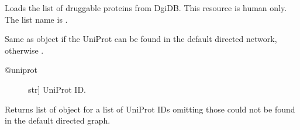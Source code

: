\documentclass[letterpaper,10pt,english]{sphinxmanual}
\begin{document}
\begin{fulllineitems}

\begin{fulllineitems}
\label{\detokenize{main:pypath.main.PyPath.dproteins}}
\end{fulllineitems}


\begin{fulllineitems}
\label{\detokenize{main:pypath.main.PyPath.dps}}
\end{fulllineitems}


\begin{fulllineitems}
\label{\detokenize{main:pypath.main.PyPath.druggability_list}}
Loads the list of druggable proteins from DgiDB. This resource
is human only.
The list name is .

\end{fulllineitems}


\begin{fulllineitems}
\label{\detokenize{main:pypath.main.PyPath.duniprot}}
Same as  object if the UniProt
can be found in the default directed network,
otherwise .
\begin{description}
\item[{@uniprot}] \leavevmode{[}str{]}
UniProt ID.

\end{description}

\end{fulllineitems}


\begin{fulllineitems}
\label{\detokenize{main:pypath.main.PyPath.duniprots}}
Returns list of  object
for a list of UniProt IDs omitting those
could not be found in the default
directed graph.


\end{fulllineitems}
\end{fulllineitems}
\end{document}
